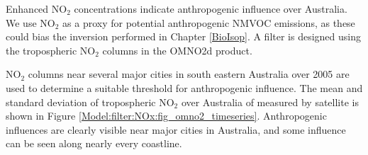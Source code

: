     Enhanced NO$_2$ concentrations indicate anthropogenic influence over Australia.
    We use NO$_2$ as a proxy for potential anthropogenic NMVOC emissions, as these could bias the inversion performed in Chapter \ref{BioIsop}.
    A filter is designed using the tropospheric NO$_2$ columns in the OMNO2d product.
    
    NO$_2$ columns near several major cities in south eastern Australia over 2005 are used to determine a suitable threshold for anthropogenic influence.
    The mean and standard deviation of tropospheric NO$_2$ over Australia of measured by satellite is shown in Figure \ref{Model:filter:NOx:fig_omno2_timeseries}.
    Anthropogenic influences are clearly visible near major cities in Australia, and some influence can be seen along nearly every coastline.
    
    
